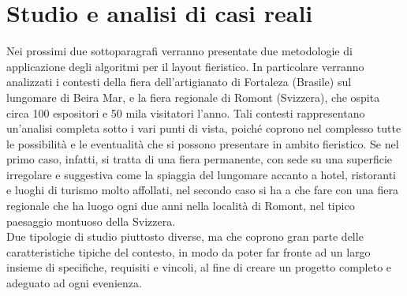 \documentclass[12pt,a4paper,openright,twoside]{report}
\begin{document}
\section{Studio e analisi di casi reali}
Nei prossimi due sottoparagrafi verranno presentate due metodologie di applicazione degli algoritmi per il layout fieristico. In particolare verranno analizzati i contesti della fiera dell'artigianato di Fortaleza (Brasile) sul lungomare di Beira Mar, e la fiera regionale di Romont (Svizzera), che ospita circa 100 espositori e 50 mila visitatori l'anno.
Tali contesti rappresentano un'analisi completa sotto i vari punti di vista, poich\'{e} coprono nel complesso tutte le possibilit\`{a} e le eventualit\`{a} che si possono presentare in ambito fieristico.
Se nel primo caso, infatti, si tratta di una fiera permanente, con sede su una superficie irregolare e suggestiva come la spiaggia del lungomare accanto a hotel, ristoranti e luoghi di turismo molto affollati, nel secondo caso si ha a che fare con una fiera regionale che ha luogo ogni due anni nella localit\`{a} di Romont, nel tipico paesaggio montuoso della Svizzera.\\
Due tipologie di studio piuttosto diverse, ma che coprono gran parte delle caratteristiche tipiche del contesto, in modo da poter far fronte ad un largo insieme di specifiche, requisiti e vincoli, al fine di creare un progetto completo e adeguato ad ogni evenienza.
\end{document}
